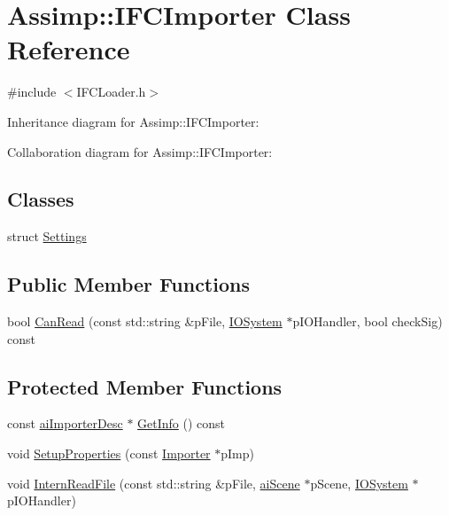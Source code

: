 \hypertarget{class_assimp_1_1_i_f_c_importer}{\section{Assimp\+:\+:I\+F\+C\+Importer Class Reference}
\label{class_assimp_1_1_i_f_c_importer}
}


{\ttfamily \#include $<$I\+F\+C\+Loader.\+h$>$}



Inheritance diagram for Assimp\+:\+:I\+F\+C\+Importer\+:


Collaboration diagram for Assimp\+:\+:I\+F\+C\+Importer\+:
\subsection*{Classes}
\begin{DoxyCompactItemize}
\item 
struct \hyperlink{struct_assimp_1_1_i_f_c_importer_1_1_settings}{Settings}
\end{DoxyCompactItemize}
\subsection*{Public Member Functions}
\begin{DoxyCompactItemize}
\item 
bool \hyperlink{class_assimp_1_1_i_f_c_importer_a097dc70abacf71c7b20d8a60c99987d7}{Can\+Read} (const std\+::string \&p\+File, \hyperlink{class_assimp_1_1_i_o_system}{I\+O\+System} $\ast$p\+I\+O\+Handler, bool check\+Sig) const 
\end{DoxyCompactItemize}
\subsection*{Protected Member Functions}
\begin{DoxyCompactItemize}
\item 
const \hyperlink{structai_importer_desc}{ai\+Importer\+Desc} $\ast$ \hyperlink{class_assimp_1_1_i_f_c_importer_aec4ab9e7ecbcadbf56741ce484734bb7}{Get\+Info} () const 
\item 
void \hyperlink{class_assimp_1_1_i_f_c_importer_ad1e3ea4947b7f534975b060bf66aad33}{Setup\+Properties} (const \hyperlink{class_assimp_1_1_importer}{Importer} $\ast$p\+Imp)
\item 
void \hyperlink{class_assimp_1_1_i_f_c_importer_aba650349165893e5e64d51f3c0c74b92}{Intern\+Read\+File} (const std\+::string \&p\+File, \hyperlink{structai_scene}{ai\+Scene} $\ast$p\+Scene, \hyperlink{class_assimp_1_1_i_o_system}{I\+O\+System} $\ast$p\+I\+O\+Handler)
\end{DoxyCompactItemize}
